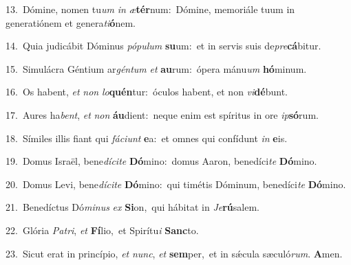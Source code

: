 {\numbfont\textcolor{\numbcolor}{13.}}~Dómine, nomen tu\textit{um} \textit{in} \textit{æ}\-\textbf{tér}num:~\star Dómine, memoriále tuum in generatiónem et genera\-\textit{ti}\-\textbf{ó}nem.\par
{\numbfont\textcolor{\numbcolor}{14.}}~Quia judicábit Dóminus \textit{pó}\-\textit{pu}\textit{lum} \textbf{su}\-um:~\star et in servis suis de\-\textit{pre}\-\textbf{cá}bitur.\par
{\numbfont\textcolor{\numbcolor}{15.}}~Simulácra Géntium ar\-\textit{gén}\-\textit{tum} \textit{et} \textbf{au}\-rum:~\star ópera mánu\textit{um} \textbf{hó}\-minum.\par
{\numbfont\textcolor{\numbcolor}{16.}}~Os habent, \textit{et} \textit{non} \textit{lo}\-\textbf{quén}tur:~\star óculos habent, et non \textit{vi}\-\textbf{dé}bunt.\par
{\numbfont\textcolor{\numbcolor}{17.}}~Aures ha\-\textit{bent}\-, \textit{et} \textit{non} \textbf{áu}\-dient:~\star neque enim est spíritus in ore \textit{ip}\-\textbf{só}rum.\par
{\numbfont\textcolor{\numbcolor}{18.}}~Símiles illis fiant qui \textit{fá}\-\textit{ci}\textit{unt} \textbf{e}\-a:~\star et omnes qui confídunt \textit{in} \textbf{e}\-is.\par
{\numbfont\textcolor{\numbcolor}{19.}}~Domus Israël, bene\-\textit{dí}\-\textit{ci}\textit{te} \textbf{Dó}\-mino:~\star domus Aaron, benedíci\textit{te} \textbf{Dó}\-mino.\par
{\numbfont\textcolor{\numbcolor}{20.}}~Domus Levi, bene\-\textit{dí}\-\textit{ci}\textit{te} \textbf{Dó}\-mino:~\star qui timétis Dóminum, benedíci\textit{te} \textbf{Dó}\-mino.\par
{\numbfont\textcolor{\numbcolor}{21.}}~Benedíctus Dó\-\textit{mi}\-\textit{nus} \textit{ex} \textbf{Si}\-on,~\star qui hábitat in \textit{Je}\-\textbf{rú}salem.\par
{\numbfont\textcolor{\numbcolor}{22.}}~Glória \textit{Pa}\-\textit{tri}, \textit{et} \textbf{Fí}\-lio,~\star et Spirítu\textit{i} \textbf{Sanc}\-to.\par
{\numbfont\textcolor{\numbcolor}{23.}}~Sicut erat in princípio, \textit{et} \textit{nunc}\-, \textit{et} \textbf{sem}\-per,~\star et in sǽcula sæculó\-\textit{rum}\-. \textbf{A}\-men.\par
